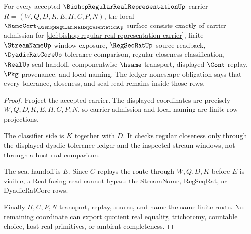 \begin{theorem}
\label{thm:bishop-regular-real-representation-namecert-obligations}
For every accepted $\BishopRegularRealRepresentationUp$ carrier $R=(W,Q,D,K,E,H,C,P,N)$, the local $\NameCert_{\BishopRegularRealRepresentationUp}$ surface consists exactly of carrier admission for \autoref{def:bishop-regular-real-representation-carrier}, finite $\StreamNameUp$ window exposure, $\RegSeqRatUp$ source readback, $\DyadicRatCoreUp$ tolerance comparison, regular closeness classification, $\RealUp$ seal handoff, componentwise $\hsame$ transport, displayed $\Cont$ replay, $\Pkg$ provenance, and local naming. The ledger nonescape obligation says that every tolerance, closeness, and seal read remains inside those rows.
\end{theorem}
\begin{proof}
Project the accepted carrier. The displayed coordinates are precisely $W,Q,D,K,E,H,C,P,N$, so carrier admission and local naming are finite row projections.

The classifier side is $K$ together with $D$. It checks regular closeness only through the displayed dyadic tolerance ledger and the inspected stream windows, not through a host real comparison.

The seal handoff is $E$. Since $C$ replays the route through $W,Q,D,K$ before $E$ is visible, a Real-facing read cannot bypass the StreamName, RegSeqRat, or DyadicRatCore rows.

Finally $H,C,P,N$ transport, replay, source, and name the same finite route. No remaining coordinate can export quotient real equality, trichotomy, countable choice, host real primitives, or ambient completeness.
\end{proof}

